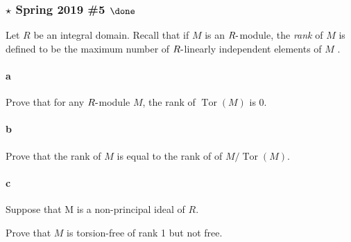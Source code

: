 \hypertarget{star-spring-2019-5-done}{%
\subsubsection{\texorpdfstring{\(\star\) Spring 2019 \#5
\(\done\)}{\textbackslash star Spring 2019 \#5 \textbackslash done}}\label{star-spring-2019-5-done}}

Let \(R\) be an integral domain. Recall that if \(M\) is an
\(R{\hbox{-}}\)module, the \emph{rank} of \(M\) is defined to be the
maximum number of \(R{\hbox{-}}\)linearly independent elements of \(M\)
.

\hypertarget{a-90}{%
\paragraph{a}\label{a-90}}

Prove that for any \(R{\hbox{-}}\)module \(M\), the rank of
\(\operatorname{Tor}(M )\) is 0.

\hypertarget{b-80}{%
\paragraph{b}\label{b-80}}

Prove that the rank of \(M\) is equal to the rank of of
\(M/\operatorname{Tor}(M )\).

\hypertarget{c-52}{%
\paragraph{c}\label{c-52}}

Suppose that M is a non-principal ideal of \(R\).

Prove that \(M\) is torsion-free of rank 1 but not free.

